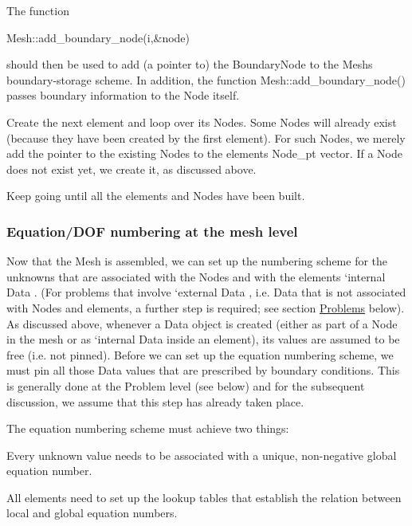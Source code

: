 \begin{DoxyEnumerate}
 The function 
\begin{DoxyCode}
Mesh::add\_boundary\_node(i,&node) 
\end{DoxyCode}
 should then be used to add (a pointer to) the {\ttfamily Boundary\+Node} to the {\ttfamily Mesh\textquotesingle{}s} boundary-\/storage scheme. In addition, the function {\ttfamily Mesh\+::add\+\_\+boundary\+\_\+node()} passes boundary information to the {\ttfamily Node} itself.
\item Create the next element and loop over its {\ttfamily Nodes}. Some {\ttfamily Nodes} will already exist (because they have been created by the first element). For such {\ttfamily Nodes}, we merely add the pointer to the existing {\ttfamily Nodes} to the element\textquotesingle{}s {\ttfamily Node\+\_\+pt} vector. If a {\ttfamily Node} does not exist yet, we create it, as discussed above.
\item Keep going until all the elements and {\ttfamily Nodes} have been built.
\end{DoxyEnumerate}\hypertarget{index_Node_DOF_numbering}{}\subsubsection{Equation/\+D\+O\+F numbering at the mesh level}\label{index_Node_DOF_numbering}
Now that the {\ttfamily Mesh} is assembled, we can set up the numbering scheme for the unknowns that are associated with the {\ttfamily Nodes} and with the elements\textquotesingle{} `internal {\ttfamily Data} \textquotesingle{}. (For problems that involve `external {\ttfamily Data} \textquotesingle{}, i.\+e. {\ttfamily Data} that is not associated with {\ttfamily Nodes} and elements, a further step is required; see section \hyperlink{index_problems}{Problems} below). As discussed above, whenever a {\ttfamily Data} object is created (either as part of a {\ttfamily Node} in the mesh or as `internal {\ttfamily Data} \textquotesingle{} inside an element), its values are assumed to be free (i.\+e. not pinned). Before we can set up the equation numbering scheme, we must pin all those {\ttfamily Data} values that are prescribed by boundary conditions. This is generally done at the {\ttfamily Problem} level (see below) and for the subsequent discussion, we assume that this step has already taken place.

The equation numbering scheme must achieve two things\+:
\begin{DoxyItemize}
\item Every unknown value needs to be associated with a unique, non-\/negative global equation number.
\item All elements need to set up the lookup tables that establish the relation between local and global equation numbers.
\end{DoxyItemize}

